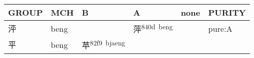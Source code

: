 \documentclass[14pt,a4paper]{scrartcl}
\begin{document}
\begin{longtable}[c]{@{}llllll@{}}
\toprule
\begin{minipage}[b]{0.14\columnwidth}\raggedright\strut
GROUP
\strut\end{minipage} &
\begin{minipage}[b]{0.14\columnwidth}\raggedright\strut
MCH
\strut\end{minipage} &
\begin{minipage}[b]{0.14\columnwidth}\raggedright\strut
B
\strut\end{minipage} &
\begin{minipage}[b]{0.14\columnwidth}\raggedright\strut
A
\strut\end{minipage} &
\begin{minipage}[b]{0.14\columnwidth}\raggedright\strut
none
\strut\end{minipage} &
\begin{minipage}[b]{0.14\columnwidth}\raggedright\strut
PURITY
\strut\end{minipage}\tabularnewline
\midrule
\endhead
\begin{minipage}[t]{0.14\columnwidth}\raggedright\strut
泙
\strut\end{minipage} &
\begin{minipage}[t]{0.14\columnwidth}\raggedright\strut
beng
\strut\end{minipage} &
\begin{minipage}[t]{0.14\columnwidth}\raggedright\strut
\strut\end{minipage} &
\begin{minipage}[t]{0.14\columnwidth}\raggedright\strut
萍\textsuperscript{840d~beng}
\strut\end{minipage} &
\begin{minipage}[t]{0.14\columnwidth}\raggedright\strut
\strut\end{minipage} &
\begin{minipage}[t]{0.14\columnwidth}\raggedright\strut
pure:A
\strut\end{minipage}\tabularnewline
\begin{minipage}[t]{0.14\columnwidth}\raggedright\strut
平
\strut\end{minipage} &
\begin{minipage}[t]{0.14\columnwidth}\raggedright\strut
beng
\strut\end{minipage} &
\begin{minipage}[t]{0.14\columnwidth}\raggedright\strut
苹\textsuperscript{82f9~bjaeng}
\strut\end{minipage} &

\end{longtable}
\end{document}
